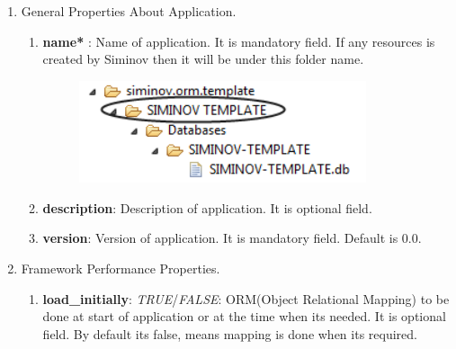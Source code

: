 \begin{enumerate}
	
	\item \small General Properties About Application.
	
		\begin{enumerate}

			\item \small \textbf{name*} : Name of application. It is mandatory field. If any resources is created by Siminov then it will be under this folder name.

			\begin{figure}[htbp]
				\centering
					\includegraphics[height=3cm]{Resources/siminov_template_application_data_folder_structure_for_application_name.png}
			\end{figure}


			\item \small \textbf{description}: Description of application. It is optional field.
			\item \small \textbf{version}: Version of application. It is mandatory field. Default is 0.0.

		\end{enumerate}

	\item \small Framework Performance Properties.
		
		\begin{enumerate}

			\item \small \textbf{load\_initially}: \textit{TRUE}/\textit{FALSE}: ORM(Object Relational Mapping) to be done at start of application or at the time when its needed. It is optional field. By default its false, means mapping is done when its required. 

			\begin{center}
				\colorbox{grey}{
					\parbox[t]{.8\linewidth}{
						\fontsize{11pt}{11pt}\selectfont %
						\vspace*{0.1cm} %
		
}}
\end{center}
\end{enumerate}
\end{enumerate}

